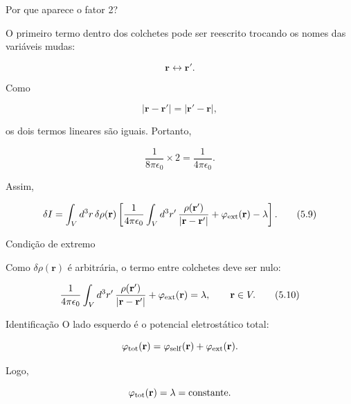 \documentclass[aspectratio=169]{beamer}
\begin{document}
\begin{frame}{Por que aparece o fator 2?}

\small

O primeiro termo dentro dos colchetes pode ser reescrito trocando os nomes das
variáveis mudas:

\[
\mathbf r \leftrightarrow \mathbf r'.
\]

Como

\[
|\mathbf r-\mathbf r'|=|\mathbf r'-\mathbf r|,
\]

os dois termos lineares são iguais. Portanto,

\[
\frac{1}{8\pi\epsilon_0}\times 2
=
\frac{1}{4\pi\epsilon_0}.
\]

Assim,

\begin{eqbox}
\begin{equation}
\delta I
=
\int_V d^3r\,\delta\rho(\mathbf r)
\left[
\frac{1}{4\pi\epsilon_0}
\int_V d^3r'\,
\frac{\rho(\mathbf r')}
{|\mathbf r-\mathbf r'|}
+
\varphi_{\rm ext}(\mathbf r)
-
\lambda
\right].
\tag{5.9}
\label{eq:variacao-fatorada}
\end{equation}
\end{eqbox}

\end{frame}

\begin{frame}{Condição de extremo}

\small

Como \(\delta\rho(\mathbf r)\) é arbitrária, o termo entre colchetes deve ser nulo:

\begin{eqbox}
\begin{equation}
\frac{1}{4\pi\epsilon_0}
\int_V d^3r'\,
\frac{\rho(\mathbf r')}
{|\mathbf r-\mathbf r'|}
+
\varphi_{\rm ext}(\mathbf r)
=
\lambda,
\qquad
\mathbf r\in V.
\tag{5.10}
\label{eq:potencial-constante}
\end{equation}
\end{eqbox}

\begin{mybox}{Identificação}
O lado esquerdo é o potencial eletrostático total:

\[
\varphi_{\rm tot}(\mathbf r)
=
\varphi_{\rm self}(\mathbf r)+\varphi_{\rm ext}(\mathbf r).
\]
\end{mybox}

Logo,

\[
\varphi_{\rm tot}(\mathbf r)=\lambda=\text{constante}.
\]

\end{frame}
\end{document}
